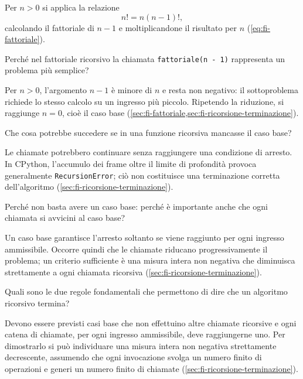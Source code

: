 Per \(n>0\) si applica la relazione
\[
  n!=n(n-1)!,
\]
calcolando il fattoriale di \(n-1\) e moltiplicandone il risultato
per \(n\) (\cref{eq:fi-fattoriale}).

\begin{exercise}
\label{ex:fi-esercizi-ricorsione-fattoriale-semplice}
Perché nel fattoriale ricorsivo la chiamata
\lstinline|fattoriale(n - 1)| rappresenta un problema più semplice?
\end{exercise}

Per \(n>0\), l'argomento \(n-1\) è minore di \(n\) e resta
non negativo: il sottoproblema richiede lo stesso calcolo su un
ingresso più piccolo. Ripetendo la riduzione, si raggiunge
\(n=0\), cioè il caso base
(\cref{sec:fi-fattoriale,sec:fi-ricorsione-terminazione}).

\begin{exercise}
\label{ex:fi-esercizi-ricorsione-senza-base}
Che cosa potrebbe succedere se in una funzione ricorsiva mancasse
il caso base?
\end{exercise}

Le chiamate potrebbero continuare senza raggiungere una condizione
di arresto. In CPython, l'accumulo dei frame oltre il limite di
profondità provoca generalmente \texttt{RecursionError}; ciò non
costituisce una terminazione corretta dell'algoritmo
(\cref{sec:fi-ricorsione-terminazione}).

\begin{exercise}
\label{ex:fi-esercizi-ricorsione-base-insufficiente}
Perché non basta avere un caso base: perché è importante anche che
ogni chiamata si avvicini al caso base?
\end{exercise}

Un caso base garantisce l'arresto soltanto se viene raggiunto per
ogni ingresso ammissibile. Occorre quindi che le chiamate
riducano progressivamente il problema; un criterio sufficiente è
una misura intera non negativa che diminuisca strettamente a ogni
chiamata ricorsiva (\cref{sec:fi-ricorsione-terminazione}).

\begin{exercise}
\label{ex:fi-esercizi-ricorsione-terminazione-regole}
Quali sono le due regole fondamentali che permettono di dire che
un algoritmo ricorsivo termina?
\end{exercise}

Devono essere previsti casi base che non effettuino altre chiamate
ricorsive e ogni catena di chiamate, per ogni ingresso ammissibile,
deve raggiungerne uno. Per dimostrarlo si può individuare una misura
intera non negativa strettamente decrescente, assumendo che ogni
invocazione svolga un numero finito di operazioni e generi un numero
finito di chiamate (\cref{sec:fi-ricorsione-terminazione}).

